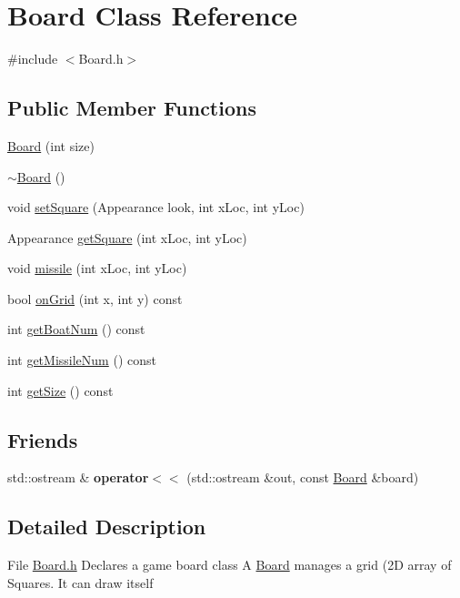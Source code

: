 \hypertarget{class_board}{
\section{Board Class Reference}
\label{class_board}
}


{\ttfamily \#include $<$Board.h$>$}\subsection*{Public Member Functions}
\begin{DoxyCompactItemize}
\item 
\hyperlink{class_board_a23ec051234acfe51d94664f9ad52a469}{Board} (int size)
\item 
\hyperlink{class_board_af73f45730119a1fd8f6670f53f959e68}{$\sim$Board} ()
\item 
void \hyperlink{class_board_a525f28458fc0a3ea79fdd69dfaa50192}{setSquare} (Appearance look, int xLoc, int yLoc)
\item 
Appearance \hyperlink{class_board_a24e413281caad849124fc21df3b3a4da}{getSquare} (int xLoc, int yLoc)
\item 
void \hyperlink{class_board_a912a73d19979c5c630f9537b1555cbc8}{missile} (int xLoc, int yLoc)
\item 
bool \hyperlink{class_board_a11d4c986e5c58a9a8544e19f24c67fac}{onGrid} (int x, int y) const 
\item 
int \hyperlink{class_board_ae2eb5e315d5c381a33cdb3bb52c42c1c}{getBoatNum} () const 
\item 
int \hyperlink{class_board_a055269f475d4935abbd42a79999586b0}{getMissileNum} () const 
\item 
int \hyperlink{class_board_a65a9e00ec8f504699ca6226f78516a1e}{getSize} () const 
\end{DoxyCompactItemize}
\subsection*{Friends}
\begin{DoxyCompactItemize}
\item 
\hypertarget{class_board_ae319e0e79692bad16793a512a2d24ea6}{
std::ostream \& {\bfseries operator$<$$<$} (std::ostream \&out, const \hyperlink{class_board}{Board} \&board)}
\label{class_board_ae319e0e79692bad16793a512a2d24ea6}

\end{DoxyCompactItemize}


\subsection{Detailed Description}
File \hyperlink{_board_8h_source}{Board.h} Declares a game board class A \hyperlink{class_board}{Board} manages a grid (2D array of Squares. It can draw itself

